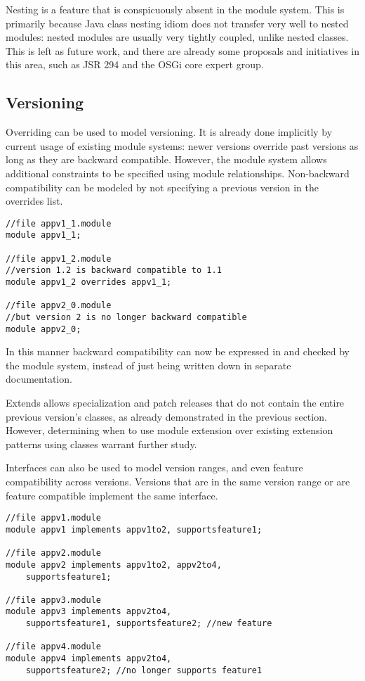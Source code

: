 Nesting is a feature that is conspicuously absent in the module system. This
is primarily because Java class nesting idiom does not transfer very well to
nested modules: nested modules are usually very tightly coupled, unlike nested
classes. This is left as future work, and there are already some proposals
and initiatives in this area, such as JSR 294 and the OSGi core expert group.

\subsection{Versioning}

Overriding can be used to model versioning. It is already done
implicitly by current usage of existing module systems: newer versions  
override past versions as long as they are backward compatible.
However, the module system allows additional constraints to be specified using
module relationships. Non-backward compatibility can be modeled by not specifying a
previous version in the overrides list.

\begin{lstlisting}[caption=Versioning Using Overrides]
//file appv1_1.module
module appv1_1;

//file appv1_2.module
//version 1.2 is backward compatible to 1.1
module appv1_2 overrides appv1_1;

//file appv2_0.module
//but version 2 is no longer backward compatible
module appv2_0; 
\end{lstlisting}

In this manner backward compatibility can now be expressed in 
and checked by the module system, instead of just being written
down in separate documentation.

Extends allows specialization and patch releases that do not contain 
the entire previous version's classes, as already demonstrated in
the previous section. However, determining when to use module
extension over existing extension patterns using classes warrant
further study.

Interfaces can also be used to model version ranges, and even feature
compatibility across versions. Versions that are in the same version 
range or are feature compatible implement the same interface.

\begin{lstlisting}[caption=Interfaces as Properties]
//file appv1.module
module appv1 implements appv1to2, supportsfeature1;

//file appv2.module
module appv2 implements appv1to2, appv2to4, 
	supportsfeature1;

//file appv3.module
module appv3 implements appv2to4, 
	supportsfeature1, supportsfeature2; //new feature

//file appv4.module
module appv4 implements appv2to4, 
	supportsfeature2; //no longer supports feature1
\end{lstlisting}

